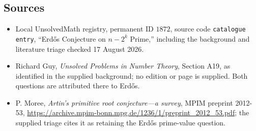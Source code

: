 \documentclass[11pt]{article}
\begin{document}
\subsection{Sources}
\begin{itemize}
\item Local UnsolvedMath registry, permanent ID $1872$, source code \texttt{catalogue entry}, ``Erd\H{o}s Conjecture on $n-2^k$ Prime,'' including the background and literature triage checked 17 August 2026.
\item Richard Guy, \emph{Unsolved Problems in Number Theory}, Section A19, as identified in the supplied background; no edition or page is supplied. Both questions are attributed there to Erd\H{o}s.
\item P. Moree, \emph{Artin's primitive root conjecture---a survey}, MPIM preprint 2012-53, \url{https://archive.mpim-bonn.mpg.de/1236/1/preprint_2012_53.pdf}; the supplied triage cites it as retaining the Erd\H{o}s prime-value question.
\end{itemize}
\end{document}
